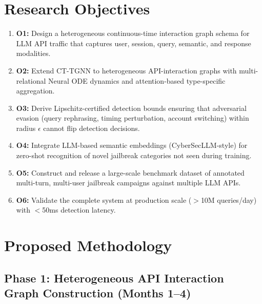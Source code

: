 \documentclass[12pt,a4paper]{article}
\begin{document}
\section{Research Objectives}

\begin{enumerate}
    \item \textbf{O1:} Design a heterogeneous continuous-time interaction graph schema for LLM API traffic that captures user, session, query, semantic, and response modalities.
    
    \item \textbf{O2:} Extend CT-TGNN to heterogeneous API-interaction graphs with multi-relational Neural ODE dynamics and attention-based type-specific aggregation.
    
    \item \textbf{O3:} Derive Lipschitz-certified detection bounds ensuring that adversarial evasion (query rephrasing, timing perturbation, account switching) within radius $\epsilon$ cannot flip detection decisions.
    
    \item \textbf{O4:} Integrate LLM-based semantic embeddings (CyberSecLLM-style) for zero-shot recognition of novel jailbreak categories not seen during training.
    
    \item \textbf{O5:} Construct and release a large-scale benchmark dataset of annotated multi-turn, multi-user jailbreak campaigns against multiple LLM APIs.
    
    \item \textbf{O6:} Validate the complete system at production scale ($>$10M queries/day) with $<$50ms detection latency.
\end{enumerate}

\section{Proposed Methodology}

\subsection{Phase 1: Heterogeneous API Interaction Graph Construction (Months 1--4)}
\end{document}
